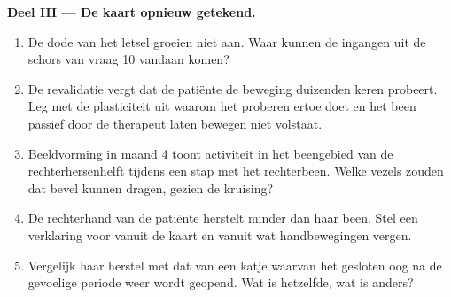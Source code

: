 \begin{problem}
\medskip
\noindent\textbf{Deel III --- De kaart opnieuw getekend.}
\begin{enumerate}[resume]
  \item De dode  van het letsel groeien niet aan. Waar kunnen de
        ingangen uit de schors van vraag 10 vandaan komen?
  \item De revalidatie vergt dat de patiënte de beweging duizenden keren
        probeert. Leg met de plasticiteit uit waarom het proberen ertoe
        doet en het been passief door de therapeut laten bewegen niet
        volstaat.
  \item Beeldvorming in maand 4 toont activiteit in het beengebied van de
        rechterhersenhelft tijdens een stap met het rechterbeen. Welke
        vezels zouden dat bevel kunnen dragen, gezien de kruising?
  \item De rechterhand van de patiënte herstelt minder dan haar been. Stel
        een verklaring voor vanuit de kaart en vanuit wat handbewegingen
        vergen.
  \item Vergelijk haar herstel met dat van een katje waarvan het gesloten
        oog na de gevoelige periode weer wordt geopend. Wat is hetzelfde,
        wat is anders?
\end{enumerate}


\end{problem}
